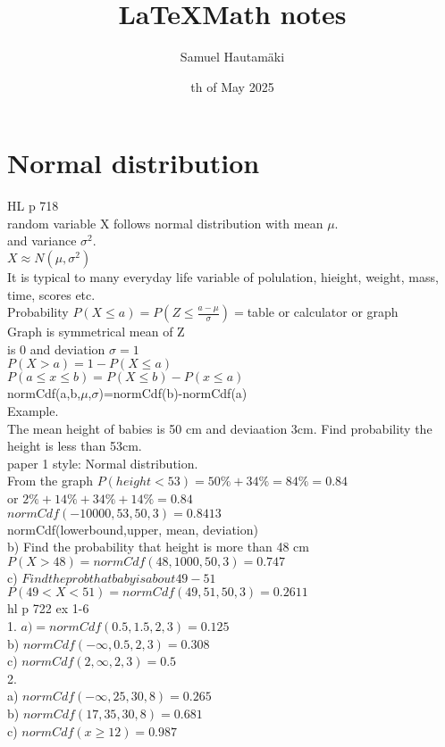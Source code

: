 \documentclass{article}
\title{\LaTeX Math notes}
\author{Samuel Hautamäki}
\date{th of May 2025}
\begin{document}
  \maketitle
   
  \section{Normal distribution}
  HL p 718\\
  random variable X follows normal distribution with mean $\mu$.\\
  and variance $\sigma^2$.\\
  $X\approx N(\mu,\sigma^2)$\\
  It is typical to many everyday life variable of polulation, hieight, weight, mass, time, scores etc.\\
  Probability $P(X\leq a)=P(Z\leq\frac{a-\mu}{\sigma})=$table or calculator or graph\\
  Graph is symmetrical mean of Z\\
  is 0 and deviation $\sigma=1$\\
  $P(X>a)=1-P(X\leq a)$\\
  $P(a\leq x\leq b)=P(X\leq b)-P(x\leq a)$\\
  normCdf(a,b,$\mu$,$\sigma$)=normCdf(b)-normCdf(a)\\
  Example.\\
  The mean height of babies is 50 cm and deviaation 3cm. Find probability the height is less than 53cm.\\
  paper 1 style: Normal distribution.\\
  From the graph $P(height<53)=50\%+34\%=84\%=0.84$\\
  or $2\%+14\%+34\%+14\%=0.84$\\
  $normCdf(-10000,53,50,3)=0.8413$\\
  normCdf(lowerbound,upper, mean, deviation)\\
  b) Find the probability that height is more than 48 cm\\
  $P(X>48)=normCdf(48,1000,50,3)=0.747$\\
  c) $Find the prob that baby is about 49-51$\\
  $P(49<X<51)=normCdf(49,51,50,3)=0.2611$\\
  hl p 722 ex 1-6\\
  1. $a)=normCdf(0.5,1.5,2,3)=0.125$\\
  b) $normCdf(-\infty,0.5,2,3)=0.308$\\
  c) $normCdf(2,\infty,2,3)=0.5$\\
  2. \\
  a) $normCdf(-\infty,25,30,8)=0.265$\\
  b) $normCdf(17,35,30,8)=0.681$\\
  c) $normCdf(x\geq 12)=0.987$\\
    

   
\end{document}
